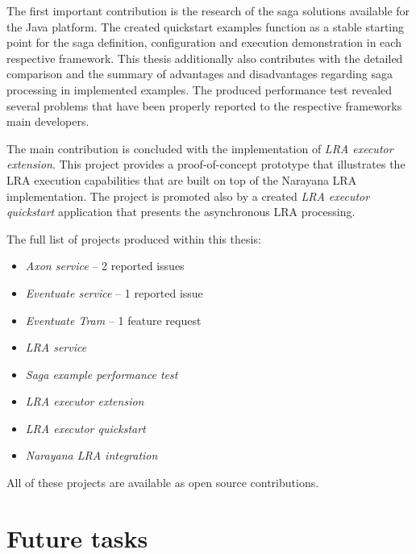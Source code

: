 \documentclass[oneside,
  digital, %
  table,   %
  lof,     %
  lot,     %
]{fithesis3}
\begin{document}
The first important contribution is the research of the saga solutions available for the Java platform. The created quickstart examples function as a stable starting point for the saga definition, configuration and execution demonstration in each respective framework. This thesis additionally also contributes with the detailed comparison and the summary of advantages and disadvantages regarding saga processing in implemented examples. The produced performance test revealed several problems that have been properly reported to the respective frameworks main developers.

The main contribution is concluded with the implementation of \textit{LRA executor extension}. This project provides a proof-of-concept prototype that illustrates the LRA execution capabilities that are built on top of the Narayana LRA implementation. The project is promoted also by a created \textit{LRA executor quickstart} application that presents the asynchronous LRA processing.

The full list of projects produced within this thesis:

\begin{itemize}
    \item \textit{Axon service} -- 2 reported issues
    
    \item \textit{Eventuate service} -- 1 reported issue
    
    \item \textit{Eventuate Tram} -- 1 feature request
    
    \item \textit{LRA service}
    
    \item \textit{Saga example performance test}
    
    \item \textit{LRA executor extension}
    
    \item \textit{LRA executor quickstart}
    
    \item \textit{Narayana LRA integration}
\end{itemize}

\noindent
All of these projects are available as open source contributions.

\section{Future tasks}
\end{document}
